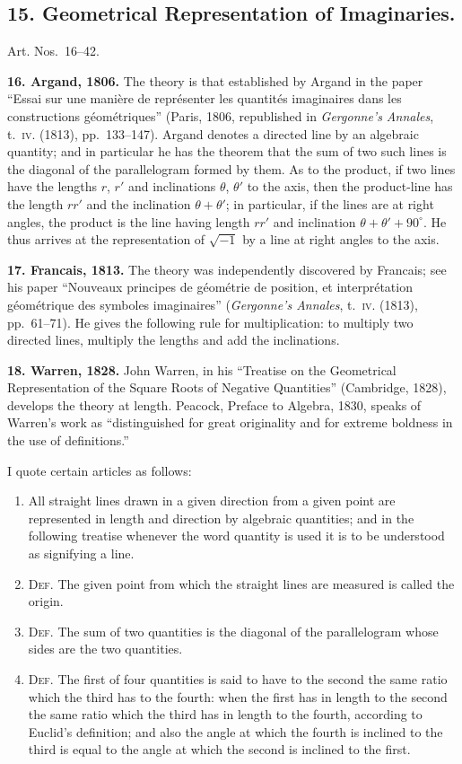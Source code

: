 \documentclass[11pt,a4paper]{article}
\theoremstyle{definition}
\begin{document}
\subsection*{15. Geometrical Representation of Imaginaries.}

Art. Nos.~16--42.

\textbf{16. Argand, 1806.} The theory is that established by Argand in the paper ``Essai sur une mani\`ere de repr\'esenter les quantit\'es imaginaires dans les constructions g\'eom\'etriques'' (Paris, 1806, republished in \textit{Gergonne's Annales}, t.~\textsc{iv}. (1813), pp.~133--147). Argand denotes a directed line by an algebraic quantity; and in particular he has the theorem that the sum of two such lines is the diagonal of the parallelogram formed by them. As to the product, if two lines have the lengths $r$, $r'$ and inclinations $\theta$, $\theta'$ to the axis, then the product-line has the length $rr'$ and the inclination $\theta + \theta'$; in particular, if the lines are at right angles, the product is the line having length $rr'$ and inclination $\theta + \theta' + 90^{\circ}$. He thus arrives at the representation of $\sqrt{-1}$ by a line at right angles to the axis.

\textbf{17. Francais, 1813.} The theory was independently discovered by Francais; see his paper ``Nouveaux principes de g\'eom\'etrie de position, et interpr\'etation g\'eom\'etrique des symboles imaginaires'' (\textit{Gergonne's Annales}, t.~\textsc{iv}. (1813), pp.~61--71). He gives the following rule for multiplication: to multiply two directed lines, multiply the lengths and add the inclinations.

\textbf{18. Warren, 1828.} John Warren, in his ``Treatise on the Geometrical Representation of the Square Roots of Negative Quantities'' (Cambridge, 1828), develops the theory at length. Peacock, Preface to Algebra, 1830, speaks of Warren's work as ``distinguished for great originality and for extreme boldness in the use of definitions.''

I quote certain articles as follows:
\begin{enumerate}[label=(\arabic*)]
\item All straight lines drawn in a given direction from a given point are represented in length and direction by algebraic quantities; and in the following treatise whenever the word quantity is used it is to be understood as signifying a line.
\item \textsc{Def.} The given point from which the straight lines are measured is called the origin.
\item \textsc{Def.} The sum of two quantities is the diagonal of the parallelogram whose sides are the two quantities.
\setcounter{enumi}{11}
\item \textsc{Def.} The first of four quantities is said to have to the second the same ratio which the third has to the fourth: when the first has in length to the second the same ratio which the third has in length to the fourth, according to Euclid's definition; and also the angle at which the fourth is inclined to the third is equal to the angle at which the second is inclined to the first.
\end{enumerate}
\end{document}
